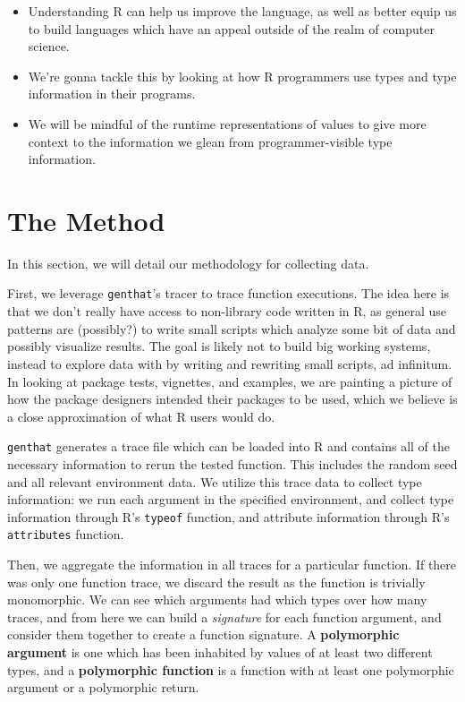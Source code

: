 \documentclass[acmsmall,10pt,review,anonymous]{acmart}\settopmatter{printfolios=true,printccs=false,printacmref=false}
\begin{document}
\begin{itemize}
    \item Understanding R can help us improve the language, as well as better equip us to build languages which have an appeal outside of the realm of computer science.
    \item We're gonna tackle this by looking at how R programmers use types and type information in their programs.
    \item We will be mindful of the runtime representations of values to give more context to the information we glean from programmer-visible type information.
\end{itemize}

%
%
%
%
%
%
\section{The Method}

In this section, we will detail our methodology for collecting data.

First, we leverage {\tt genthat}'s tracer to trace function executions.
The idea here is that we don't really have access to non-library code written in R, as general use patterns are (possibly?) to write small scripts which analyze some bit of data and possibly visualize results.
The goal is likely not to build big working systems, instead to explore data with by writing and rewriting small scripts, ad infinitum.
In looking at package tests, vignettes, and examples, we are painting a picture of how the package designers intended their packages to be used, which we believe is a close approximation of what R users would do.

{\tt genthat} generates a trace file which can be loaded into R and contains all of the necessary information to rerun the tested function.
This includes the random seed and all relevant environment data.
We utilize this trace data to collect type information:
we run each argument in the specified environment, and collect type information through R's {\tt typeof} function, and attribute information through R's {\tt attributes} function.

Then, we aggregate the information in all traces for a particular function.
If there was only one function trace, we discard the result as the function is trivially monomorphic.
We can see which arguments had which types over how many traces, and from here we can build a \textit{signature} for each function argument, and consider them together to create a function signature.
A \textbf{polymorphic argument} is one which has been inhabited by values of at least two different types, and a \textbf{polymorphic function} is a function with at least one polymorphic argument or a polymorphic return.
\end{document}
